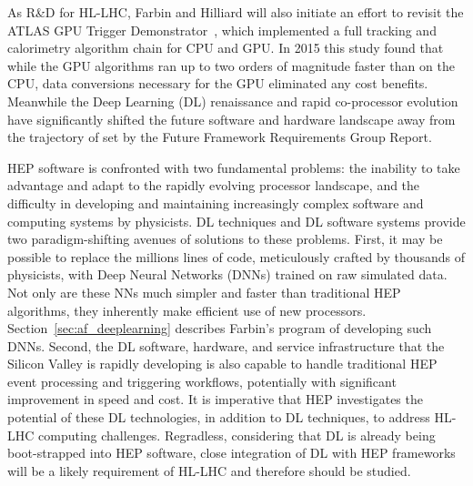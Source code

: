 

As R\&D for HL-LHC, Farbin and Hilliard will also initiate an effort
to revisit the ATLAS GPU Trigger Demonstrator~\cite{}, which
implemented a full tracking and calorimetry algorithm chain for CPU
and GPU. In 2015 this study found that while the GPU algorithms ran up
to two orders of magnitude faster than on the CPU, data conversions
necessary for the GPU eliminated any cost benefits. Meanwhile the Deep
Learning (DL) renaissance and rapid co-processor evolution have
significantly shifted the future software and hardware landscape away
from the trajectory of set by the Future Framework Requirements Group
Report.

HEP software is confronted with two fundamental problems: the
inability to take advantage and adapt to the rapidly evolving
processor landscape, and the difficulty in developing and maintaining
increasingly complex software and computing systems by physicists. DL
techniques and DL software systems provide two paradigm-shifting
avenues of solutions to these problems. First, it may be possible to
replace the millions lines of code, meticulously crafted by thousands
of physicists, with Deep Neural Networks (DNNs) trained on raw
simulated data. Not only are these NNs much simpler and faster than
traditional HEP algorithms, they inherently make efficient use of new
processors. Section~\ref{sec:af_deeplearning} describes Farbin's
program of developing such DNNs. Second, the DL software, hardware,
and service infrastructure that the Silicon Valley is rapidly
developing is also capable to handle traditional HEP event processing
and triggering workflows, potentially with significant improvement in
speed and cost. It is imperative that HEP investigates the potential
of these DL technologies, in addition to DL techniques, to address
HL-LHC computing challenges. Regradless, considering that DL is
already being boot-strapped into HEP software, close integration of DL
with HEP frameworks will be a likely requirement of HL-LHC and
therefore should be studied.

